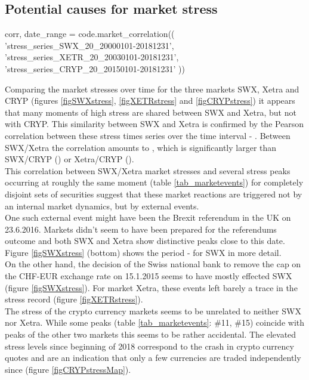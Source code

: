 \documentclass[11pt,twoside,a4paper]{article}
\numberwithin{equation}{section}
\numberwithin{figure}{section}
\numberwithin{table}{section}
\begin{document}
\subsection{Potential causes for market stress}
\begin{pycode}
corr, date_range = code.market_correlation((
	'stress_series_SWX_20_20000101-20181231',
	'stress_series_XETR_20_20030101-20181231',
	'stress_series_CRYP_20_20150101-20181231'
	))
\end{pycode}
Comparing the market stresses over time for the three markets SWX, Xetra and CRYP (figures \ref{figSWXstress}, \ref{figXETRstress} and \ref{figCRYPstress}) it appears that many moments of high stress are shared between SWX and Xetra, but not with CRYP. This similarity between SWX and Xetra is confirmed by the Pearson correlation between these stress times series over the time interval  - . Between SWX/Xetra the correlation amounts to , which is significantly larger than SWX/CRYP () or Xetra/CRYP ().\\

This correlation between SWX/Xetra market stresses and several stress peaks occurring at roughly the same moment (table \ref{tab_marketevents}) for completely disjoint sets of securities suggest that these market reactions are triggered not by an internal market dynamics, but by external events.\\
One such external event might have been the Brexit referendum in the UK on 23.6.2016. Markets didn't seem to have been prepared for the referendums outcome and both SWX and Xetra show distinctive peaks close to this date. Figure \ref{figSWXstress} (bottom) shows the period  -  for SWX in more detail.\\
On the other hand,  the decision of the Swiss national bank to remove the cap on the CHF-EUR exchange rate on 15.1.2015 seems to have mostly effected SWX (figure \ref{figSWXstress}). For market Xetra, these events left barely a trace in the stress record (figure \ref{figXETRstress}).\\
The stress of the crypto currency markets seems to be unrelated to neither SWX nor Xetra. While some peaks (table \ref{tab_marketevents}: \#11, \#15) coincide with peaks of the other two markets this seems to be rather accidental. The elevated stress levels since beginning of 2018 correspond to the crash in crypto currency quotes and are an indication that only a few currencies are traded independently since (figure \ref{figCRYPstressMap}).\\
\end{document}
